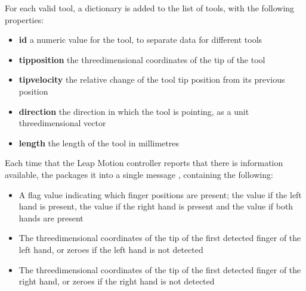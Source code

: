 For each valid tool, a dictionary is added to the list of tools, with the following
properties:
\begin{itemize}
\item\textbf{id} \longDash{} a numeric value for the tool, to separate data for different
tools
\item\exSp\textbf{tipposition} \longDash{} the three\longDash{}dimensional coordinates of
the tip of the tool
\item\exSp\textbf{tipvelocity} \longDash{} the relative change of the tool tip position
from its previous position
\item\exSp\textbf{direction} \longDash{} the direction in which the tool is pointing, as a
unit three\longDash{}dimensional vector
\item\exSp\textbf{length} \longDash{} the length of the tool in millimetres
\end{itemize}
\primaryEnd{}
Each time that the Leap Motion controller reports that there is information available,
the  packages it into a single message
\openSq{}\closeSq, containing the following:
\begin{itemize}
\item A flag value indicating which finger positions are present; the value  if
the left hand is present, the value  if the right hand is present and the value
 if both hands are present
\item\exSp{}The three\longDash{}dimensional coordinates of the tip of the first detected
finger of the left hand, or zeroes if the left hand is not detected
\item\exSp{}The three\longDash{}dimensional coordinates of the tip of the first detected
finger of the right hand, or zeroes if the right hand is not detected
\end{itemize}
\primaryEnd{}
